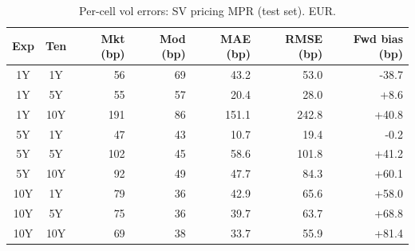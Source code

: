 \begin{table}[H]
\centering
\caption{Per-cell vol errors: SV pricing MPR (test set). EUR.}
\label{tab:sv_pricing_per_cell_test}
\small
\begin{tabular}{@{}ccrrrrr@{}}
\toprule
\textbf{Exp} & \textbf{Ten} & \textbf{Mkt (bp)} & \textbf{Mod (bp)} & \textbf{MAE (bp)} & \textbf{RMSE (bp)} & \textbf{Fwd bias (bp)} \\
\midrule
  1Y & 1Y & 56 & 69 & 43.2 & 53.0 & -38.7 \\
  1Y & 5Y & 55 & 57 & 20.4 & 28.0 & +8.6 \\
  1Y & 10Y & 191 & 86 & 151.1 & 242.8 & +40.8 \\
  \midrule
  5Y & 1Y & 47 & 43 & 10.7 & 19.4 & -0.2 \\
  5Y & 5Y & 102 & 45 & 58.6 & 101.8 & +41.2 \\
  5Y & 10Y & 92 & 49 & 47.7 & 84.3 & +60.1 \\
  \midrule
  10Y & 1Y & 79 & 36 & 42.9 & 65.6 & +58.0 \\
  10Y & 5Y & 75 & 36 & 39.7 & 63.7 & +68.8 \\
  10Y & 10Y & 69 & 38 & 33.7 & 55.9 & +81.4 \\
\bottomrule
\end{tabular}
\end{table}